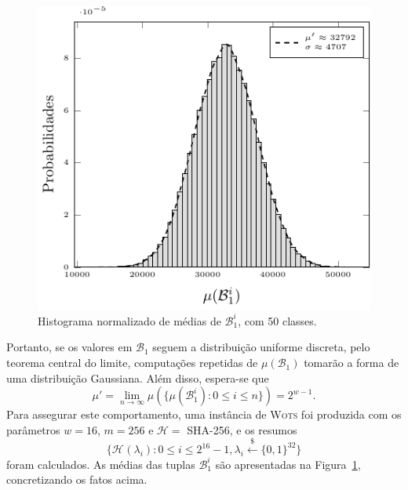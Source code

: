 \documentclass{ufsctex/ufsctex}
\newcommand{\hh}{\mathcal{H}}
\newcommand{\hash}[2][]{\mathcal{H}^{#1} (#2)}
\newcommand{\binwds}[1]{\{0, 1\}^{#1}}
\newcommand{\random}{\stackrel{\$}{\longleftarrow}}
\newcommand{\wots}{\textsc{Wots}}
\begin{document}
\begin{figure}
  \centering
  \includegraphics{support/hist}
  \caption{Histograma normalizado de médias de $\mathcal{B}_{1}^{i}$, com 50
    classes.}\label{fig:12}
\end{figure}

Portanto, se os valores em $\mathcal{B}_{1}$ seguem a distribuição uniforme
discreta, pelo teorema central do limite, computações repetidas de
$\mu(\mathcal{B}_{1})$ tomarão a forma de uma distribuição Gaussiana. Além
disso, espera-se que
\begin{equation}
  \mu' = \lim_{n \to \infty}
    \mu(\{\mu(\mathcal{B}_{1}^{i}) : 0 \leq i \leq n\}) = 2^{w - 1}.
\end{equation}
Para assegurar este comportamento, uma instância de \wots{} foi produzida com
os parâmetros $w = 16$, $m = 256$ e $\hh{} =$ SHA-256, e os resumos
\begin{equation}
  \{\hash{\lambda_i} : 0 \leq i \leq 2^{16} - 1, \lambda_i
    \random{} \binwds{32}\}
\end{equation}
foram calculados. As médias das tuplas $\mathcal{B}_{1}^{i}$ são apresentadas
na Figura~\ref{fig:12}, concretizando os fatos acima.
\end{document}
